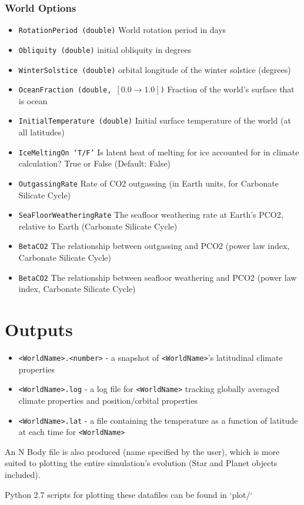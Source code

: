 \documentclass[usenatbib,11pt]{article}
\begin{document}
\subsubsection{World Options}

\begin{itemize}
\item{\texttt{RotationPeriod (double)}} World rotation period in days
\item{\texttt{Obliquity (double)}} initial obliquity in degrees
\item{\texttt{WinterSolstice (double)}} orbital longitude of the winter solstice (degrees)
\item{\texttt{OceanFraction (double, $[0.0 \rightarrow 1.0]$)}} Fraction of the world's surface that is ocean
\item{\texttt{InitialTemperature (double)}} Initial surface temperature of the world (at all latitudes)
\item{\texttt{IceMeltingOn `T/F'}} Is latent heat of melting for ice accounted for in climate calculation? True or False  (Default: False)

\item{\texttt{OutgassingRate}} Rate of CO2 outgassing (in Earth units, for Carbonate Silicate Cycle)
\item{\texttt{SeaFloorWeatheringRate}} The seafloor weathering rate at Earth's PCO2, relative to Earth (Carbonate Silicate Cycle)
\item{\texttt{BetaCO2}} The relationship between outgassing and PCO2 (power law index,  Carbonate Silicate Cycle)
\item{\texttt{BetaCO2}} The relationship between seafloor weathering and PCO2 (power law index,  Carbonate Silicate Cycle)

\end{itemize}

\section{Outputs}

\begin{itemize}
\item{\texttt{<WorldName>.<number>}} - a  snapshot of \texttt{<WorldName>}'s latitudinal climate properties
\item{\texttt{<WorldName>.log}} - a log file for \texttt{<WorldName>} tracking globally averaged climate properties and position/orbital properties
\item{\texttt{<WorldName>.lat}} - a file containing the temperature as a function of latitude at each time for \texttt{<WorldName>}
\end{itemize}


An N Body file is also produced (name specified by the user), which is more suited to plotting the entire simulation's evolution (Star and Planet objects included).

Python 2.7 scripts for plotting these datafiles can be found in `plot/`
\end{document}
